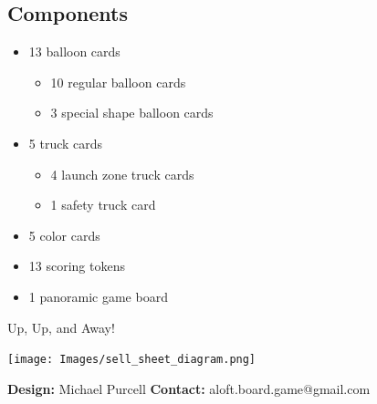 \documentclass[a5paper, DIV=18, 12pt]{scrartcl}
\begin{document}
\begin{multicols}{2}
\section*{\textcolor{SunriseBlue}{Components}}
\begin{itemize}[nosep, leftmargin=*]
	\item 13 balloon cards
	\begin{itemize}[nosep, leftmargin=*]
	  \item 10 regular balloon cards
	  \item 3 special shape balloon cards
	\end{itemize}
	\vspace{1ex}
	\item 5 truck cards
	\begin{itemize}[nosep, leftmargin=*]
	  \item 4 launch zone truck cards
	  \item 1 safety truck card
	\end{itemize}
	\vspace{1ex}
	\item 5 color cards
	\vspace{1ex}
	\item 13 scoring tokens
	\vspace{1ex}
	\item 1 panoramic game board
\end{itemize}
\vspace{3.2ex}
{\setmainfont[Scale=1.125]{Fredoka-Bold}\LARGE \hfill \textcolor{SunriseBlue}{Up, Up, and Away!}}
\end{multicols}
\begin{center}
\vspace{-1.5ex}
\texttt{[image: Images/sell\_sheet\_diagram.png]}
\end{center}
\textbf{Design:} Michael Purcell \hfill \textbf{Contact:} aloft.board.game@gmail.com
\end{document}
